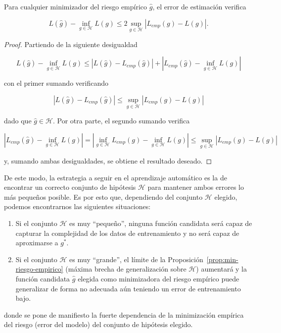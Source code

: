 \begin{proposicion}\label{prop:min-riesgo-empirico}
    Para cualquier minimizador del riesgo empírico $\hat{g}$, el error de estimación verifica

    \[ L(\hat{g}) - \inf_{g \in \mathcal{H}}L(g) \leq 2 \sup_{g \in \mathcal{H}}|L_{emp}(g) - L(g)|. \]\newline
\end{proposicion}

\begin{proof}
    Partiendo de la siguiente desigualdad

    \[ L(\hat{g}) - \inf_{g \in \mathcal{H}}L(g) \leq  |L(\hat{g}) - L_{emp}(\hat{g})| + |L_{emp}(\hat{g}) - \inf_{g \in \mathcal{H}}L(g)| \]

    con el primer sumando verificando

    \[ |L(\hat{g}) - L_{emp}(\hat{g})| \leq \sup_{g \in \mathcal{H}}|L_{emp}(g) - L(g)|\]

    dado que $\hat{g} \in \mathcal{H}$. Por otra parte, el segundo sumando verifica

    \[ |L_{emp}(\hat{g}) - \inf_{g \in \mathcal{H}}L(g)| = |\inf_{g \in \mathcal{H}} L_{emp}(g) - \inf_{g \in \mathcal{H}}L(g)| \leq \sup_{g \in \mathcal{H}}|L_{emp}(g) - L(g)| \]

    y, sumando ambas desigualdades, se obtiene el resultado deseado.\newline
\end{proof}

De este modo, la estrategia a seguir en el aprendizaje automático es la de encontrar un correcto conjunto de hipótesis $\mathcal{H}$ para mantener ambos errores lo más pequeños posible. Es por esto que, dependiendo del conjunto $\mathcal{H}$ elegido, podemos encontrarnos las siguientes situaciones:

\begin{enumerate}
    \item Si el conjunto $\mathcal{H}$ es muy ``pequeño'', ninguna función candidata será capaz de capturar la complejidad de los datos de entrenamiento y no será capaz de aproximarse a $g^{*}$.
    \item Si el conjunto $\mathcal{H}$ es muy ``grande'', el límite de la Proposición~\ref{prop:min-riesgo-empirico} (máxima brecha de generalización sobre $\mathcal{H}$) aumentará y la función candidata $\hat{g}$ elegida como minimizadora del riesgo empírico puede generalizar de forma no adecuada aún teniendo un error de entrenamiento bajo.
\end{enumerate}

donde se pone de manifiesto la fuerte dependencia de la minimización empírica del riesgo (error del modelo) del conjunto de hipótesis elegido.\newline